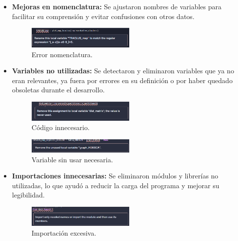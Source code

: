 \begin{itemize}
    \item \textbf{Mejoras en nomenclatura:} Se ajustaron nombres de variables para facilitar su comprensión y evitar confusiones con otros datos.
    
\begin{figure}[h!]
    \centering
    \includegraphics[width=0.5\textwidth]{img/sonarq_regularexp.png}
    \caption{Error nomenclatura.}
    \label{fig:trayectorias_Spectral}
\end{figure}    
    
    \item \textbf{Variables no utilizadas:} Se detectaron y eliminaron variables que ya no eran relevantes, ya fuera por errores en su definición o por haber quedado obsoletas durante el desarrollo.
    
\begin{figure}[h!]
    \centering
    \includegraphics[width=0.5\textwidth]{img/sonarq_codigo_sobrante.png}
    \caption{Código innecesario.}
    \label{fig:trayectorias_Spectral}
\end{figure}

\begin{figure}[h!]
    \centering
    \includegraphics[width=0.5\textwidth]{img/sonarq_unused.png}
    \caption{Variable sin usar necesaria.}
    \label{fig:trayectorias_Spectral}
\end{figure}    
    
    \item \textbf{Importaciones innecesarias:} Se eliminaron módulos y librerías no utilizadas, lo que ayudó a reducir la carga del programa y mejorar su legibilidad.
    
\begin{figure}[h!]
    \centering
    \includegraphics[width=0.5\textwidth]{img/sonarq_imports.png}
    \caption{Importación excesiva.}
    \label{fig:trayectorias_Spectral}
\end{figure}
   

\end{itemize}
